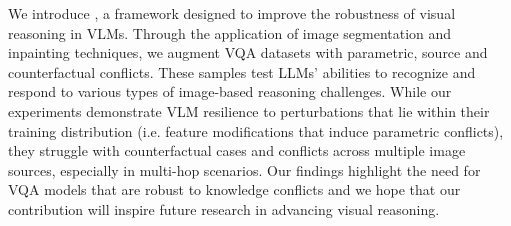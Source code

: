 


We introduce \segsub, a framework designed to improve the robustness of visual reasoning in VLMs. Through the application of image segmentation and inpainting techniques, we augment VQA datasets with parametric, source and counterfactual conflicts. These samples test LLMs' abilities to recognize and respond to various types of image-based reasoning challenges. While our experiments demonstrate VLM resilience to perturbations that lie within their training distribution (i.e. feature modifications that induce parametric conflicts), they struggle with counterfactual cases and conflicts across multiple image sources, especially in multi-hop scenarios. Our findings highlight the need for VQA models that are robust to knowledge conflicts and we hope that our contribution will inspire future research in advancing visual reasoning. 



